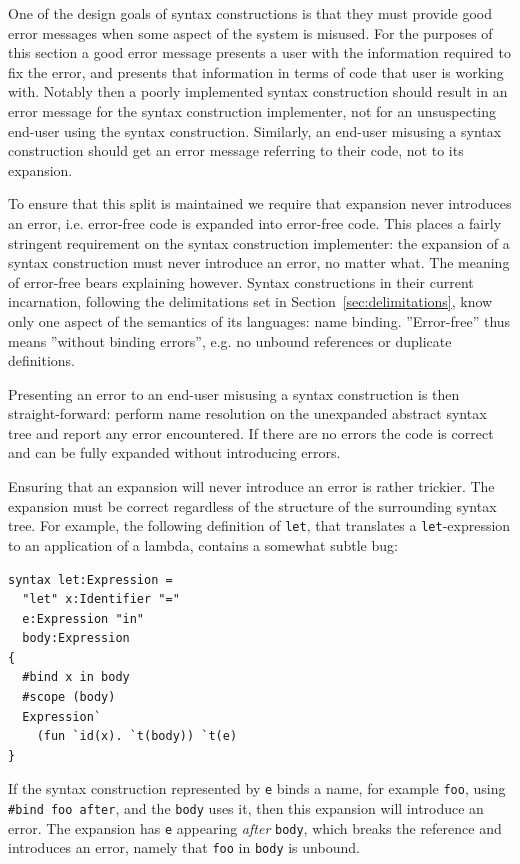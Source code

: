 \documentclass{kththesis}
\begin{document}
One of the design goals of syntax constructions is that they must provide good error messages when some aspect of the system is misused. For the purposes of this section a good error message presents a user with the information required to fix the error, and presents that information in terms of code that user is working with. Notably then a poorly implemented syntax construction should result in an error message for the syntax construction implementer, not for an unsuspecting end-user using the syntax construction. Similarly, an end-user misusing a syntax construction should get an error message referring to their code, not to its expansion.

To ensure that this split is maintained we require that expansion never introduces an error, i.e. error-free code is expanded into error-free code. This places a fairly stringent requirement on the syntax construction implementer: the expansion of a syntax construction must never introduce an error, no matter what. The meaning of error-free bears explaining however. Syntax constructions in their current incarnation, following the delimitations set in Section~\ref{sec:delimitations}, know only one aspect of the semantics of its languages: name binding. ''Error-free'' thus means ''without binding errors'', e.g. no unbound references or duplicate definitions.

Presenting an error to an end-user misusing a syntax construction is then straight-forward: perform name resolution on the unexpanded abstract syntax tree and report any error encountered. If there are no errors the code is correct and can be fully expanded without introducing errors.

Ensuring that an expansion will never introduce an error is rather trickier. The expansion must be correct regardless of the structure of the surrounding syntax tree. For example, the following definition of \texttt{let}, that translates a \texttt{let}-expression to an application of a lambda, contains a somewhat subtle bug:

\begin{verbatim}
syntax let:Expression =
  "let" x:Identifier "="
  e:Expression "in"
  body:Expression
{
  #bind x in body
  #scope (body)
  Expression`
    (fun `id(x). `t(body)) `t(e)
}
\end{verbatim}

If the syntax construction represented by \texttt{e} binds a name, for example \texttt{foo}, using \texttt{#bind foo after}, and the \texttt{body} uses it, then this expansion will introduce an error. The expansion has \texttt{e} appearing \emph{after} \texttt{body}, which breaks the reference and introduces an error, namely that \texttt{foo} in \texttt{body} is unbound.
\end{document}
